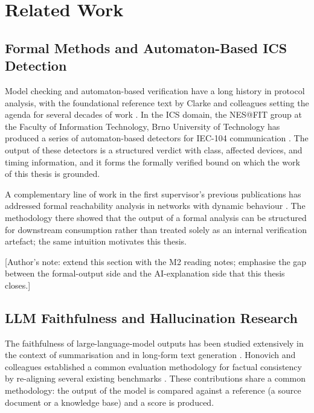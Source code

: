 \chapter{Related Work}
\label{ch:related-work}

\section{Formal Methods and Automaton-Based ICS Detection}
\label{sec:related-formal}

Model checking and automaton-based verification have a long history in protocol
analysis, with the foundational reference text by Clarke and colleagues setting the
agenda for several decades of work \autocite{ClarkeModelChecking2001}. In the ICS
domain, the NES@FIT group at the Faculty of Information Technology, Brno University
of Technology has produced a series of automaton-based detectors for IEC-104
communication \autocite{HolikMatousekRysavyVojnar2023}. The output of these
detectors is a structured verdict with class, affected devices, and timing
information, and it forms the formally verified bound on which the work of this
thesis is grounded.

A complementary line of work in the first supervisor's previous publications has
addressed formal reachability analysis in networks with dynamic behaviour
\autocite{DeSilva2014FormalReachability}. The methodology there showed that the
output of a formal analysis can be structured for downstream consumption rather than
treated solely as an internal verification artefact; the same intuition motivates
this thesis.

[Author's note: extend this section with the M2 reading notes; emphasise the gap
between the formal-output side and the AI-explanation side that this thesis closes.]

\section{LLM Faithfulness and Hallucination Research}
\label{sec:related-faithfulness}

The faithfulness of large-language-model outputs has been studied extensively in the
context of summarisation \autocite{Maynez2020Faithfulness} and in long-form text
generation \autocite{Min2023FActScore}. Honovich and colleagues established a common
evaluation methodology for factual consistency by re-aligning several existing
benchmarks \autocite{Honovich2022True}. These contributions share a common
methodology: the output of the model is compared against a reference (a source
document or a knowledge base) and a score is produced.

